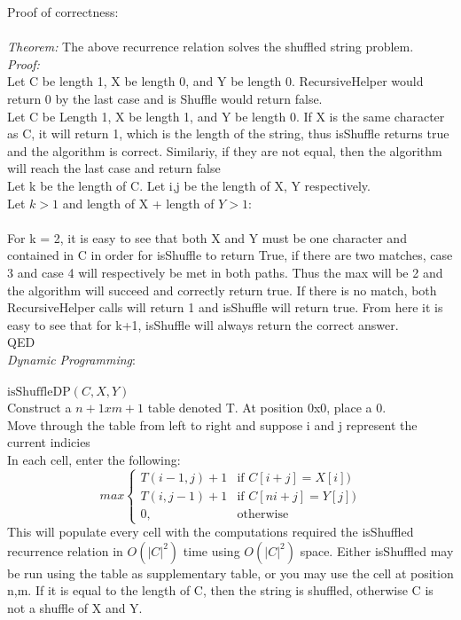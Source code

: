 \documentclass{article}
\begin{document}
\begin{enumerate}
Proof of correctness:\\
\\
\emph{Theorem:} The above recurrence relation solves the shuffled string problem. \\
\emph{Proof:} \\
Let C be length 1, X be length 0, and Y be length 0. RecursiveHelper would return 0 by the last case and is Shuffle would return false. \\
Let C be Length 1, X be length 1, and Y be length 0. If X is the same character as C, it will return 1, which is the length of the string, thus isShuffle returns true and the algorithm is correct. Similariy, if they are not equal, then the algorithm will reach the last case and return false\\
Let k be the length of C. Let i,j be the length of X, Y respectively. \\
Let $k > 1$ and length of X + length of $Y > 1$: \\
\\
For k = 2, it is easy to see that both X and Y must be one character and contained in C in order for isShuffle to return True, if there are two matches, case 3 and case 4 will respectively be met in both paths. Thus the max will be 2 and the algorithm will succeed and correctly return true. If there is no match, both RecursiveHelper calls will return 1 and isShuffle will return true. From here it is easy to see that for k+1, isShuffle will always return the correct answer.
\\
QED\\

\emph{Dynamic Programming}:\\
\\
$\text{isShuffleDP}(C, X, Y)$\\

Construct a $n+1 x m+1$ table denoted T. At position 0x0, place a 0. \\
Move through the table from left to right and suppose i and j represent the current indicies\\
In each cell, enter the following: \\
    \[
     max
    \begin{cases}
        T(i - 1, j) + 1  & \text{if } C[i+j] = X[i])\\
        T(i, j - 1) + 1  & \text{if } C[ni+j] = Y[j])\\
        0, & \text{otherwise}
    \end{cases}
    \]
This will populate every cell with the computations required the isShuffled recurrence relation in $O(|C|^2)$ time using $O(|C|^2)$ space. Either isShuffled may be run using the table as supplementary table, or you may use the cell at position n,m. If it is equal to the length of C, then the string is shuffled, otherwise C is not a shuffle of X and Y.



\end{enumerate}
\end{document}
